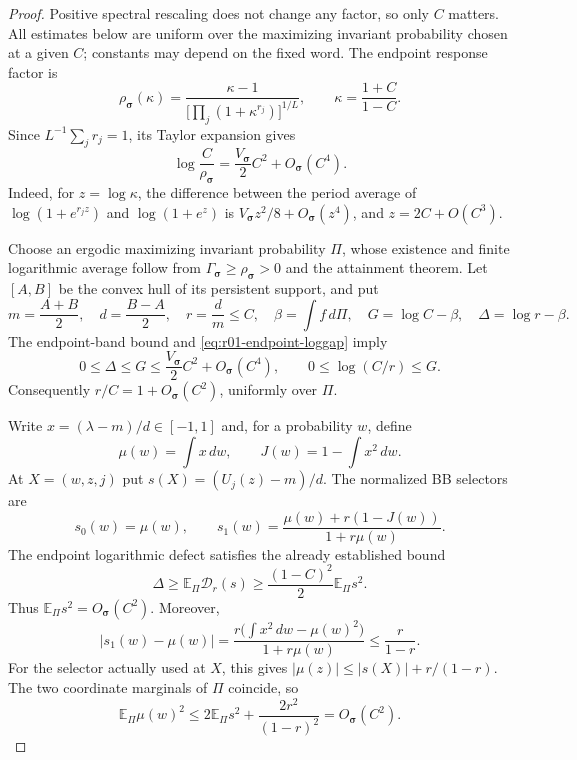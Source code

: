 \begin{proof}
Positive spectral rescaling does not change any factor, so only $C$ matters.
All estimates below are uniform over the maximizing invariant probability
chosen at a given $C$; constants may depend on the fixed word.  The endpoint
response factor is
\[
 \rho_{\bm\sigma}(\kappa)
 =\frac{\kappa-1}
 {\bigl[\prod_j(1+\kappa^{r_j})\bigr]^{1/L}},
 \qquad \kappa=\frac{1+C}{1-C}.
\]
Since $L^{-1}\sum_j r_j=1$, its Taylor expansion gives
\begin{equation}\label{eq:r01-endpoint-loggap}
 \log\frac{C}{\rho_{\bm\sigma}}
 =\frac{V_{\bm\sigma}}2C^2+O_{\bm\sigma}(C^4).
\end{equation}
Indeed, for $z=\log\kappa$, the difference between the period average
of $\log(1+e^{r_jz})$ and $\log(1+e^z)$ is
$V_{\bm\sigma}z^2/8+O_{\bm\sigma}(z^4)$, and
$z=2C+O(C^3)$.

Choose an ergodic maximizing invariant probability $\Pi$, whose existence
and finite logarithmic average follow from
$\Gamma_{\bm\sigma}\ge\rho_{\bm\sigma}>0$ and the attainment theorem.
Let $[A,B]$ be the convex hull of its persistent support, and put
\[
 m=\frac{A+B}{2},\quad d=\frac{B-A}{2},\quad
 r=\frac dm\le C,\quad
 \beta=\int f\,d\Pi,\quad
 G=\log C-\beta,\quad \Delta=\log r-\beta.
\]
The endpoint-band bound and \eqref{eq:r01-endpoint-loggap} imply
\begin{equation}\label{eq:r01-basic-smallness}
 0\le\Delta\le G\le\frac{V_{\bm\sigma}}2C^2+O_{\bm\sigma}(C^4),
 \qquad
 0\le\log(C/r)\le G.
\end{equation}
Consequently $r/C=1+O_{\bm\sigma}(C^2)$, uniformly over $\Pi$.

Write $x=(\lambda-m)/d\in[-1,1]$ and, for a probability $w$, define
\[
 \mu(w)=\int x\,dw,\qquad
 J(w)=1-\int x^2\,dw.
\]
At $X=(w,z,j)$ put $s(X)=(U_j(z)-m)/d$.  The normalized BB selectors are
\[
 s_0(w)=\mu(w),\qquad
 s_1(w)=\frac{\mu(w)+r(1-J(w))}{1+r\mu(w)}.
\]
The endpoint logarithmic defect satisfies the already established bound
\[
 \Delta\ge\mathbb E_\Pi\mathcal D_r(s)
 \ge\frac{(1-C)^2}{2}\mathbb E_\Pi s^2.
\]
Thus $\mathbb E_\Pi s^2=O_{\bm\sigma}(C^2)$.  Moreover,
\[
 |s_1(w)-\mu(w)|
 =\frac{r\bigl(\int x^2\,dw-\mu(w)^2\bigr)}{1+r\mu(w)}
 \le\frac{r}{1-r}.
\]
For the selector actually used at $X$, this gives
$|\mu(z)|\le|s(X)|+r/(1-r)$.  The two coordinate marginals of $\Pi$
coincide, so
\begin{equation}\label{eq:r01-second-moments}
 \mathbb E_\Pi\mu(w)^2
 \le2\mathbb E_\Pi s^2+\frac{2r^2}{(1-r)^2}
 =O_{\bm\sigma}(C^2).
\end{equation}


\end{proof}
